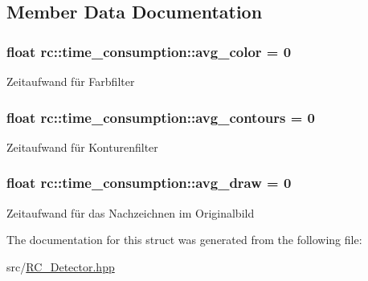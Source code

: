\subsection{Member Data Documentation}
\hypertarget{structrc_1_1time__consumption_af6c0bde60b738f03712474c1806cc220}{
\subsubsection[{avg\+\_\+color}]{\setlength{\rightskip}{0pt plus 5cm}float rc\+::time\+\_\+consumption\+::avg\+\_\+color = 0}}\label{structrc_1_1time__consumption_af6c0bde60b738f03712474c1806cc220}
Zeitaufwand für Farbfilter \hypertarget{structrc_1_1time__consumption_a0489745a27d37811eb1e92b42b3c4177}{
\subsubsection[{avg\+\_\+contours}]{\setlength{\rightskip}{0pt plus 5cm}float rc\+::time\+\_\+consumption\+::avg\+\_\+contours = 0}}\label{structrc_1_1time__consumption_a0489745a27d37811eb1e92b42b3c4177}
Zeitaufwand für Konturenfilter \hypertarget{structrc_1_1time__consumption_afd38ef6d81f21860ab5c1a219f0e2bc5}{
\subsubsection[{avg\+\_\+draw}]{\setlength{\rightskip}{0pt plus 5cm}float rc\+::time\+\_\+consumption\+::avg\+\_\+draw = 0}}\label{structrc_1_1time__consumption_afd38ef6d81f21860ab5c1a219f0e2bc5}
Zeitaufwand für das Nachzeichnen im Originalbild 

The documentation for this struct was generated from the following file\+:\begin{DoxyCompactItemize}
\item 
src/\hyperlink{RC__Detector_8hpp}{R\+C\+\_\+\+Detector.\+hpp}\end{DoxyCompactItemize}
